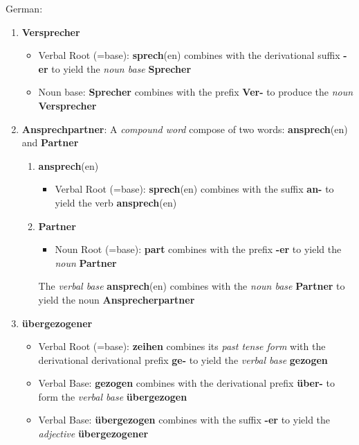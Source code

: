 \documentclass[11pt]{article}
\begin{document}
\begin{solution}
German:
\begin{enumerate}
	\item \textbf{Versprecher}
		\begin{itemize}
			\item Verbal Root (=base): \textbf{sprech}(en) combines with the derivational suffix \textbf{-er} to yield the \textit{noun base} \textbf{Sprecher}
			\item Noun base: \textbf{Sprecher} combines with the prefix \textbf{Ver-} to produce the \textit{noun} \textbf{Versprecher}
		\end{itemize}
	\item \textbf{Ansprechpartner}: A \textit{compound word} compose of two words: \textbf{ansprech}(en) and \textbf{Partner}
		\begin{enumerate}
			\item \textbf{ansprech}(en)
				\begin{itemize}
					\item Verbal Root (=base): \textbf{sprech}(en) combines with the suffix \textbf{an-} to yield the verb \textbf{ansprech}(en)
				\end{itemize}
			\item \textbf{Partner}
				\begin{itemize}
					\item Noun Root (=base): \textbf{part} combines with the prefix \textbf{-er} to yield the \textit{noun} \textbf{Partner}
				\end{itemize}
			The \textit{verbal base} \textbf{ansprech}(en) combines with the \textit{noun base} \textbf{Partner} to yield the noun \textbf{Ansprecherpartner}
		\end{enumerate}
	\item \textbf{{\"u}bergezogener}
		\begin{itemize}
			\item Verbal Root (=base): \textbf{zeihen} combines its \textit{past tense form} with the derivational derivational prefix \textbf{ge-} to yield the \textit{verbal base} \textbf{gezogen}
			\item Verbal Base: \textbf{gezogen} combines with the derivational prefix \textbf{{\"u}ber-} to form the \textit{verbal base} \textbf{{\"u}bergezogen}
			\item Verbal Base: \textbf{{\"u}bergezogen} combines with the suffix \textbf{-er} to yield the \textit{adjective} \textbf{{\"u}bergezogener} 
		\end{itemize}
\end{enumerate}
\end{solution}
\end{document}
